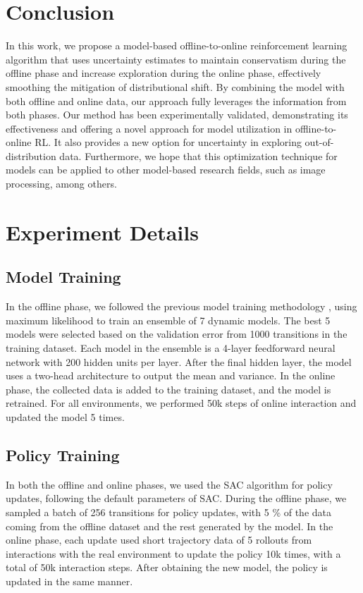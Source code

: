 \documentclass[conference]{IEEEtran}
\begin{document}
\section{Conclusion}
In this work, we propose a model-based offline-to-online reinforcement learning algorithm that uses uncertainty estimates to maintain conservatism during the offline phase and increase exploration during the online phase, effectively smoothing the mitigation of distributional shift. By combining the model with both offline and online data, our approach fully leverages the information from both phases. Our method has been experimentally validated, demonstrating its effectiveness and offering a novel approach for model utilization in offline-to-online RL. It also provides a new option for uncertainty in exploring out-of-distribution data. Furthermore, we hope that this optimization technique for models can be applied to other model-based research fields, such as image processing, among others.

\appendices
\section{Experiment Details}
\label{a}
\subsection{Model Training}
In the offline phase, we followed the previous model training methodology \cite{mopo,combo}, using maximum likelihood to train an ensemble of 7 dynamic models. The best 5 models were selected based on the validation error from 1000 transitions in the training dataset. Each model in the ensemble is a 4-layer feedforward neural network with 200 hidden units per layer. After the final hidden layer, the model uses a two-head architecture to output the mean and variance. In the online phase, the collected data is added to the training dataset, and the model is retrained. For all environments, we performed 50k steps of online interaction and updated the model 5 times.

\subsection{Policy Training}
In both the offline and online phases, we used the SAC algorithm for policy updates, following the default parameters of SAC. During the offline phase, we sampled a batch of 256 transitions for policy updates, with 5 \% of the data coming from the offline dataset and the rest generated by the model. In the online phase, each update used short trajectory data of 5 rollouts from interactions with the real environment to update the policy 10k times, with a total of 50k interaction steps. After obtaining the new model, the policy is updated in the same manner.
\end{document}
